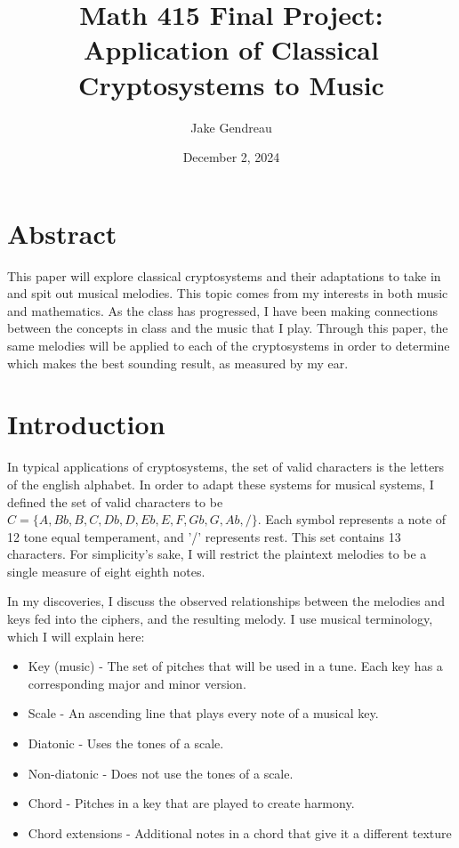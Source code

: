 \documentclass[14pt]{article}
\title{Math 415 Final Project: Application of Classical Cryptosystems to Music}
\author{Jake Gendreau}
\date{December 2, 2024}
\begin{document}
	\maketitle

	\tableofcontents

	\section{Abstract}
    This paper will explore classical cryptosystems and their adaptations to take in and spit out musical melodies. This topic comes from my interests in both music and mathematics. As the class has progressed, I have been making connections between the concepts in class and the music that I play. Through this paper, the same melodies will be applied to each of the cryptosystems in order to determine which makes the best sounding result, as measured by my ear.

	\section{Introduction}
    In typical applications of cryptosystems, the set of valid characters is the letters of the english alphabet. In order to adapt these systems for musical systems, I defined the set of valid characters to be $C = \{A, Bb, B, C, Db, D, Eb, E, F, Gb, G, Ab, /\}$. Each symbol represents a note of 12 tone equal temperament, and '/' represents rest. This set contains 13 characters. For simplicity's sake, I will restrict the plaintext melodies to be a single measure of eight eighth notes.

    In my discoveries, I discuss the observed relationships between the melodies and keys fed into the ciphers, and the resulting melody. I use musical terminology, which I will explain here:
    \begin{itemize}
        \item Key (music) - The set of pitches that will be used in a tune. Each key has a corresponding major and minor version.
        \item Scale - An ascending line that plays every note of a musical key.
        \item Diatonic - Uses the tones of a scale.
        \item Non-diatonic - Does not use the tones of a scale.
        \item Chord - Pitches in a key that are played to create harmony.
        \item Chord extensions - Additional notes in a chord that give it a different texture
    \end{itemize}
\end{document}
